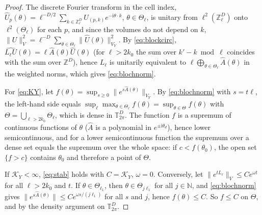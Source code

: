 \documentclass[11pt,a4paper]{article}
\theoremstyle{plain}
\theoremstyle{definition}
\theoremstyle{remark}
\numberwithin{equation}{section}
\newcommand{\Z}{\mathbb{Z}}
\newcommand{\N}{\mathbb{N}}
\newcommand{\T}{\mathbb{T}}
\newcommand{\ii}{\mathrm{i}}
\begin{document}
\begin{proof}
The discrete Fourier transform in the cell index, $\hat U_p(\theta)=\ell^{-D/2}\sum_{k\in\Z_\ell^D}U_{(p,k)}e^{-\ii\theta\cdot k}$, $\theta\in\Theta_\ell$, is unitary from $\ell^2(\Z_\ell^D)$ onto $\ell^2(\Theta_\ell)$ for each $p$, and since the volumes do not depend on $k$, $\|U\|_V^2=\ell^{-D}\sum_{\theta\in\Theta_\ell}\|\hat U(\theta)\|_{V_Y}^2$. By \eqref{eq:blockcirc}, $\widehat{L_\ell U}(\theta)=\ell\hat A(\theta)\hat U(\theta)$ (for $\ell>2k_0$ the sum over $k'-k \bmod\ell$ coincides with the sum over $\Z^D$), hence $L_\ell$ is unitarily equivalent to $\ell\bigoplus_{\theta\in\Theta_\ell}\hat A(\theta)$ in the weighted norms, which gives \eqref{eq:blochnorm}.

For \eqref{eq:KY}, let $f(\theta)=\sup_{s\ge0}\|e^{s\hat A(\theta)}\|_{V_Y}$. By \eqref{eq:blochnorm} with $s=t\ell$, the left-hand side equals $\sup_\ell\max_{\theta\in\Theta_\ell}f(\theta)=\sup_{\theta\in\Theta}f(\theta)$ with $\Theta=\bigcup_{\ell>2k_0}\Theta_\ell$, which is dense in $\T^D_{2\pi}$. The function $f$ is a supremum of continuous functions of $\theta$ ($\hat A$ is a polynomial in $e^{\pm\ii\theta_d}$), hence lower semicontinuous, and for a lower semicontinuous function the supremum over a dense set equals the supremum over the whole space: if $c<f(\theta_0)$, the open set $\{f>c\}$ contains $\theta_0$ and therefore a point of $\Theta$.

If $\mathcal K_Y<\infty$, \eqref{eq:stab} holds with $C=\mathcal K_Y$, $\omega=0$. Conversely, let $\|e^{tL_\ell}\|_V\le Ce^{\omega t}$ for all $\ell>2k_0$ and $t$. If $\theta\in\Theta_{\ell_1}$, then $\theta\in\Theta_{j\ell_1}$ for all $j\in\N$, and \eqref{eq:blochnorm} gives $\|e^{s\hat A(\theta)}\|\le Ce^{\omega s/(j\ell_1)}$ for all $s$ and $j$, hence $f(\theta)\le C$. So $f\le C$ on $\Theta$, and by the density argument on $\T^D_{2\pi}$.
\end{proof}
\end{document}
